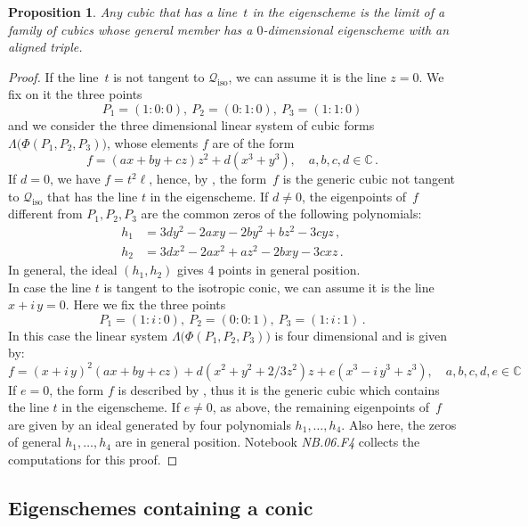 \documentclass[a4paper, 11pt, reqno]{amsart}
\theoremstyle{plain}
\newtheorem{prop}[lemma]{Proposition}
\theoremstyle{definition}
\newcommand{\C}{\mathbb{C}}
\newcommand{\nb}[2]{\textsl{{NB}.{#1}.{#2}}}
\newcommand{\iii}{\textit{i}\,}
\newcommand{\iso}{\mathcal{Q}_{\mathrm{iso}}}
\begin{document}
%
\begin{prop}
\label{proposition:limitCubics}
Any cubic that has a line~$t$ in the eigenscheme is the limit of a family of cubics whose general member has a $0$-dimensional eigenscheme with an aligned triple.
\end{prop}
\begin{proof}
If the line~$t$ is not tangent to $\iso$, we can assume it is the line $z=0$. We fix on it the three points
%
\[
  P_1= (1: 0: 0), \ P_2 = (0: 1: 0), \ P_3 = (1: 1: 0)
\]
%
and we consider the three dimensional linear system of cubic forms $\Lambda \bigl( \Phi(P_1, P_2, P_3) \bigr)$, whose elements $f$ are of the form
%
\[
  f = (ax + by + cz)z^2 + d(x^3+y^3), \quad a, b, c, d \in \C \,.
\]
%
If $d=0$, we have $f=t^2 \ell$, hence, by , the form~$f$ is the
generic cubic not tangent to $\iso$ that has the line $t$ in the eigenscheme.
If $d \neq 0$, the eigenpoints of~$f$ different from $P_1, P_2, P_3$ are
the common zeros of the following polynomials:
%
\begin{align*}
  h_1 & = 3dy^2 - 2axy - 2by^2 + bz^2 - 3cyz \,,\\
  h_2 & = 3dx^2 - 2ax^2 + az^2 - 2bxy - 3cxz \,.
\end{align*}
%
In general, the ideal $(h_1, h_2)$ gives $4$ points in
general position. \\
In case the line $t$ is tangent to the isotropic conic, we can
assume it is the line $x+\iii y =0$. Here we fix the three
points
\[
P_1 = (1: \iii: 0), \ P_2 = (0: 0: 1), \ P_3 = (1: \iii: 1) \,.
\]
In this case the linear system
$\Lambda \bigl(\Phi(P_1, P_2, P_3)\bigr)$ is four dimensional and
is given by:
\[
f = (x+\iii y)^2(ax + by+cz)+
 d(x^2 + y^2 + 2/3z^2)z+e (x^3 -\iii y^3 + z^3),
 \quad a, b, c, d, e \in \C
\]
If $e=0$, the form $f$ is described by , thus it is the generic cubic which contains the line $t$ in the eigenscheme. If $e \not= 0$, as above,
the remaining eigenpoints of~$f$ are given by an ideal generated
by four polynomials $h_1, \dotsc, h_4$.
Also here, the zeros of general $h_1, \dotsc, h_4$ are in general position.
Notebook \nb{06}{F4} collects the computations for this proof.
\end{proof}

\subsection{Eigenschemes containing a conic}
\end{document}
